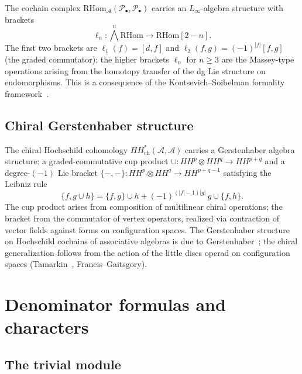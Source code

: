 \begin{theorem}\label{thm:linfty-cochains}
The cochain complex $\mathrm{RHom}_{\mathcal{A}}(\mathcal{P}_\bullet,
\mathcal{P}_\bullet)$ carries an $L_\infty$-algebra structure with brackets
\[
\ell_n: \textstyle\bigwedge^n \mathrm{RHom} \to \mathrm{RHom}[2-n].
\]
The first two brackets are $\ell_1(f) = [d, f]$ and
$\ell_2(f, g) = (-1)^{|f|}[f, g]$ (the graded commutator);
the higher brackets $\ell_n$ for $n \geq 3$ are
the Massey-type operations arising from the homotopy
transfer of the dg Lie structure on endomorphisms.
This is a consequence of the Kontsevich--Soibelman formality
framework~\cite{KontsevichSoibelman}.
\end{theorem}

\subsection{Chiral Gerstenhaber structure}

\begin{theorem}\label{thm:chiral-gerstenhaber}
The chiral Hochschild cohomology
$HH^*_{\mathrm{ch}}(\mathcal{A}, \mathcal{A})$
carries a Gerstenhaber algebra structure: a graded-commutative cup product
$\cup: HH^p \otimes HH^q \to HH^{p+q}$ and a degree-$(-1)$ Lie bracket
$\{-,-\}: HH^p \otimes HH^q \to HH^{p+q-1}$ satisfying the Leibniz
rule
\[
\{f, g \cup h\} = \{f, g\} \cup h
  + (-1)^{(|f|-1)|g|}\, g \cup \{f, h\}.
\]
The cup product arises from composition of multilinear chiral operations;
the bracket from the commutator of vertex operators, realized via
contraction of vector fields against forms on configuration spaces.
The Gerstenhaber structure on Hochschild cochains of associative algebras
is due to Gerstenhaber~\cite{Ger63}; the chiral generalization follows
from the action of the little discs operad on configuration spaces
(Tamarkin~\cite{Tamarkin00}, Francis--Gaitsgory).
\end{theorem}

\section{Denominator formulas and characters}\label{sec:denominator-formulas}

\subsection{The trivial module}

